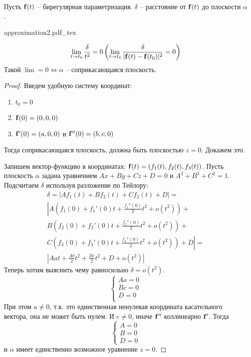 \documentclass[main]{subfiles}
\begin{document}
\begin{theorem}
    Пусть $\mathbf{f}(t)$ -- бирегулярная параметризация.
    $\delta$ -- расстояние от $\mathbf{f}(t)$ до плоскости $\alpha$.
    \begin{center}
        {approximation2.pdf_tex}
    \end{center}
    \[\lim_{t \to t_0} \frac{\delta}{t^2} = 0 \left( \lim_{t \to t_0} \frac{\delta}{|\mathbf{f}(t) - \mathbf{f}(t_0)|^2} = 0 \right)\]
    Такой $\lim = 0 \Leftrightarrow \alpha$ -- соприкасающаяся плоскость.
\end{theorem}
\begin{proof}
    Введем удобную систему координат:
    \begin{enumerate}
        \item $t_0 = 0$
        \item $\mathbf{f}(0) = (0,0,0)$
        \item $\mathbf{f}'(0) = (a,0,0)$ и $\mathbf{f}''(0) = (b,c,0)$
    \end{enumerate}
    Тогда соприкасающаяся плоскость, должна быть плоскостью $z=0$. Докажем это.

    Запишем вектор-функцию в координатах: $\mathbf{f}(t) = (f_1(t), f_2(t), f_3(t))$.
    Пусть плоскость $\alpha$ задана уравнением $Ax+By+Cz+D = 0$ и $A^2 + B^2 + C^2 = 1$.
    Подсчитаем $\delta$ используя разложение по Тейлору:
    \begin{multline*}
        \delta = |Af_1(t) + Bf_2(t) + Cf_3(t) + D| =\\
        \left| A \left(f_1(0) + f_1'(0)t + \frac{f_1''(0)}{2}t^2 + o(t^2)\right) + \right.\\
        B \left(f_2(0) + f_2'(0)t + \frac{f_2''(0)}{2}t^2 + o(t^2)\right) + \\
        \left. C \left(f_3(0) + f_3'(0)t + \frac{f_3''(0)}{2}t^2 + o(t^2)\right) + D \right| = \\
        \left| Aat + \frac{Ab}{2} t^2 + \frac{Bc}{2}t^2 + D + o(t^2) \right|
    \end{multline*}
    Теперь хотим выяснить чему равносильно $\delta = o(t^2)$.
    \[\begin{cases}
            Aa = 0 \\
            Bc = 0 \\
            D = 0  \\
        \end{cases}\]
    При этом $a \neq 0$, т.к. это единственная ненулевая координата касательного вектора, она не может быть нулем.
    И $c \neq 0$, иначе $\mathbf{f}''$ коллинеарно $\mathbf{f}'$. Тогда
    \[\begin{cases}
            A = 0 \\
            B = 0 \\
            D = 0
        \end{cases}\]
    и $\alpha$ имеет единственно возможное уравнение $z = 0$.
\end{proof}
\end{document}
